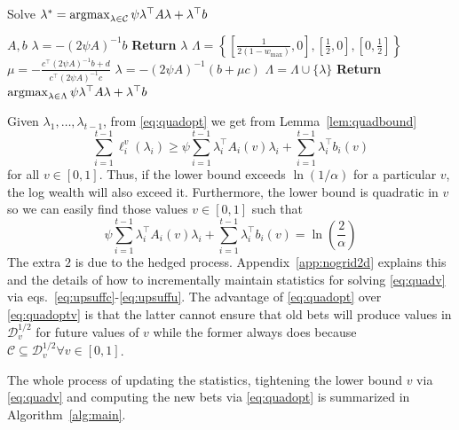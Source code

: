 \begin{algorithm}[tb]
   \caption{Solve $\lambda^* = \operatorname*{argmax}_{\lambda \in \mathcal{C}} \psi \lambda^\top A \lambda + \lambda^\top b$}
   \label{alg:argmax}
\begin{algorithmic}
     $A, b$
    \STATE $\lambda = -(2\psi A)^{-1} b$
        \STATE \textbf{Return} $\lambda$
    \ENDIF
    \STATE $\Lambda = \left\{\left[\frac{1}{2(1-w_{\max})},0\right],\left[\frac12,0\right],\left[0,\frac12\right]\right\}$     
    \STATE $\mu = -\frac{c^\top (2\psi A)^{-1}b+d}{c^\top (2\psi A)^{-1}c}$
    \STATE $\lambda = -(2\psi A)^{-1} (b + \mu c)$ 
    \STATE $\Lambda = \Lambda \cup \{\lambda\}$ 
    \ENDIF 
    \ENDFOR
    \STATE \textbf{Return}  $\operatorname*{argmax}_{\lambda \in \Lambda} \psi \lambda^\top A \lambda + \lambda^\top b$
\end{algorithmic}
\end{algorithm}

Given $\lambda_1,\ldots,\lambda_{t-1}$, from \eqref{eq:quadopt} 
we get from Lemma~\ref{lem:quadbound} 
\[
\sum_{i=1}^{t-1} \ell_i^v(\lambda_i)
\geq
\psi  
 \sum_{i=1}^{t-1} \lambda_i^\top A_i(v)\lambda_i  +  \sum_{i=1}^{t-1} \lambda_i^\top b_i(v)
\]
for all $v \in [0,1]$. Thus, if the lower bound exceeds $\ln(1/\alpha)$ 
for a particular $v$, the log wealth will also exceed it. Furthermore,
the lower bound is quadratic in $v$ so we can easily find those values
$v \in [0,1]$ such that
\begin{equation}
   \psi  
 \sum_{i=1}^{t-1} \lambda_i^\top A_i(v)\lambda_i  +  \sum_{i=1}^{t-1} \lambda_i^\top b_i(v) = \ln\left(\frac{2}{\alpha}\right) 
 \label{eq:quadv}
\end{equation} 
The extra $2$ is due to the hedged process.  Appendix~\ref{app:nogrid2d}
explains this and the details of how to incrementally maintain statistics for solving
\eqref{eq:quadv} via eqs.~\eqref{eq:upsuffc}-\eqref{eq:upsuffu}.  The advantage
of \eqref{eq:quadopt} over \eqref{eq:quadoptv} is that the latter cannot ensure
that old bets will produce values in $\mathcal{D}_v^{1/2}$ for future values of
$v$ while the former always does because $\mathcal{C} \subseteq
\mathcal{D}_{v}^{1/2} \forall v \in [0,1]$. 

The whole process of updating the statistics, tightening the lower bound $v$
via \eqref{eq:quadv} and computing the new bets via \eqref{eq:quadopt} is
summarized in Algorithm~\ref{alg:main}.

